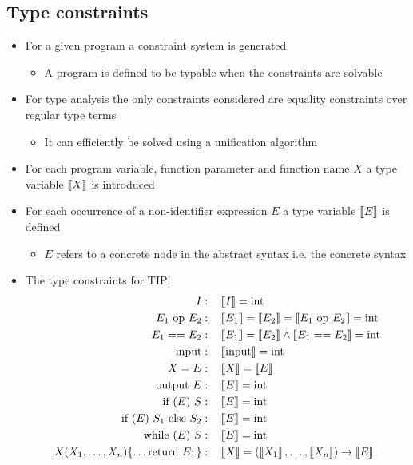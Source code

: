 \subsection{Type constraints}
\begin{itemize}
	\item For a given program a constraint system is generated
  \begin{itemize}
  	\item A program is defined to be typable when the constraints are solvable 
  \end{itemize}
  \item For type analysis the only constraints considered are equality constraints over regular type terms
  \begin{itemize}
  	\item It can efficiently be solved using a unification algorithm
  \end{itemize}
  \item For each program variable, function parameter and function name $X$ a type variable $\left\llbracket X\right\rrbracket$ is introduced
  \item For each occurrence of a non-identifier expression $E$ a type variable $\left\llbracket E\right\rrbracket$ is defined
  \begin{itemize}
  	\item $E$ refers to a concrete node in the abstract syntax i.e. the concrete syntax
  \end{itemize}
  \item The type constraints for TIP:
  \begin{align*} 
    I: & \quad  \co{I} = \text{int} \\
    E_1 \text{ op } E_2: & \quad \co{E_1} = \co{E_2} = \co{E_1 \text{ op } E_2} = \text{int}\\ 
    E_1 == E_2: & \quad \co{E_1} = \co{E_2} \land \co{E_1 == E_2} = \text{int}\\ 
    \text{input}: & \quad \co{\text{input}} = \text{int} \\
    X = E : & \quad \co{X} = \co{E} \\
    \text{output } E : & \quad \co{E} = \text{int} \\
    \text{if } (E) \ S: & \quad \co{E} = \text{int} \\
    \text{if } (E) \ S_1 \text{ else } S_2: & \quad \co{E} = \text{int} \\
    \text{while } (E) \ S: & \quad \co{E} = \text{int} \\
    X(X_1, \dots, X_n)\{\dots \text{return } E;\} : & \quad \co{X} = (\co{X_1}, \dots, \co{X_n}) \rightarrow \co{E} \\

\end{align*}
\end{itemize}
